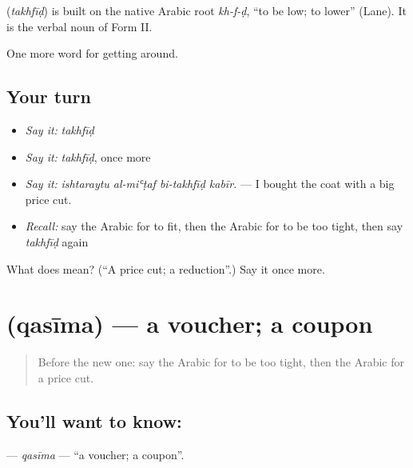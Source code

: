 \begin{cousinweb}
\textbf{} (\emph{takhfīḍ}) is built on the native Arabic root \emph{kh-f-ḍ}, \textquotedblleft{}to be low; to lower\textquotedblright{} (Lane). It is the verbal noun of Form II.
\end{cousinweb}

\begin{grammarlens}[title={What you've built}]
One more word for getting around.
\end{grammarlens}

\subsection*{Your turn}
\begin{itemize}
\raggedright
  \item \emph{Say it:} \emph{takhfīḍ}
  \item \emph{Say it:} \emph{takhfīḍ}, once more
  \item \emph{Say it:} \emph{ishtaraytu al-miʿṭaf bi-takhfīḍ kabīr.} — I bought the coat with a big price cut.
  \item \emph{Recall:} say the Arabic for to fit, then the Arabic for to be too tight, then say \emph{takhfīḍ} again
\end{itemize}

\begin{tcolorbox}[breakable,colback=teal!4,colframe=teal!35!black,title={Before you move on}]
What does  mean? (\textquotedblleft{}A price cut; a reduction\textquotedblright{}.) Say it once more.
\end{tcolorbox}
\section[\texorpdfstring{\ar{قسيمة} (qasīma)}{قسيمة (qasīma)}]{ (qasīma) — a voucher; a coupon}

\label{lesson:AR-C457-qasima}



\begin{quote}
Before the new one: say the Arabic for to be too tight, then the Arabic for a price cut.
\end{quote}

\subsection*{You'll want to know: }
\textbf{} — \emph{qasīma} — \textquotedblleft{}a voucher; a coupon\textquotedblright{}.

